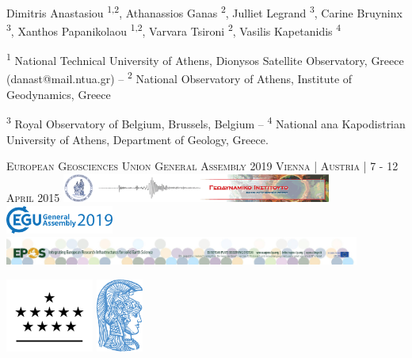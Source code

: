 \documentclass[landscape,a0paper,fontscale=0.324]{baposter} %
\begin{document}
\begin{poster}
{\large Dimitris Anastasiou \textsuperscript{1,2}, Athanassios Ganas \textsuperscript{2}, Julliet Legrand \textsuperscript{3}, Carine Bruyninx \textsuperscript{3}, Xanthos Papanikolaou \textsuperscript{1,2}, Varvara Tsironi \textsuperscript{2}, Vasilis Kapetanidis \textsuperscript{4} 
{\small \par{\textsuperscript{1} National Technical University of Athens, Dionysos Satellite Observatory, Greece (danast@mail.ntua.gr) -- \textsuperscript{2} National Observatory of Athens, Institute of Geodynamics, Greece} 
\par{\textsuperscript{3} Royal Observatory of Belgium, Brussels, Belgium --  \textsuperscript{4} National ana Kapodistrian University of Athens, Department of Geology, Greece. }} \vspace{0.3em}
\par{\textsc{European Geosciences Union General Assembly 2019 Vienna | Austria | 7 - 12 April 2015}} 
\vskip 0.2cm
{\includegraphics[height=2.5em]{../../logos/gein_logo.png} \includegraphics[height=2.5em]{../../logos/egu19_logo.png} \includegraphics[height=2.5em]{../../logos/epos_logo_big.jpg}} %

 }
{\includegraphics[height=6.5em]{../../logos/logo_orb.png} \includegraphics[height=6.5em]{../../logos/logo_uoa_blue.png}} %


\end{poster}
\end{document}
